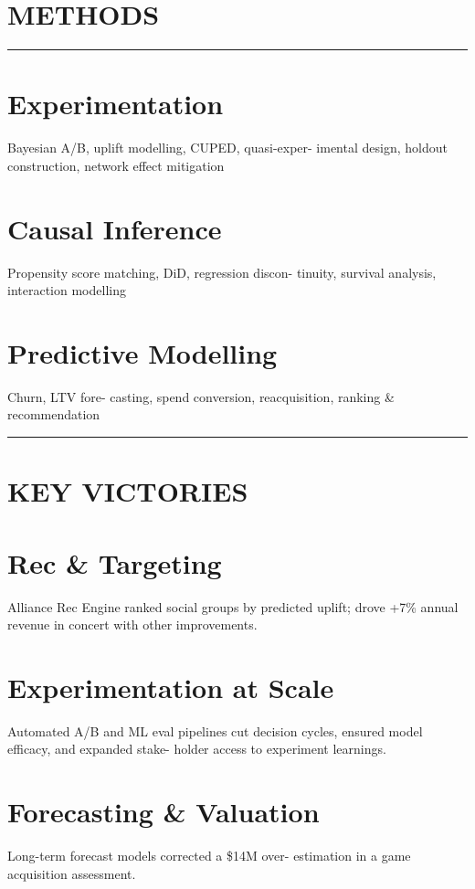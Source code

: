 %

\section{METHODS}
\vspace{-0.1cm}%
\noindent\rule{\textwidth}{0.4pt}
\vspace{-0.1cm}%
%
\section{\large Experimentation}
Bayesian A/B, uplift modelling, CUPED, quasi-exper- imental design, holdout construction, network effect mitigation
~
\section{\large Causal Inference}
Propensity score matching, DiD, regression discon- tinuity, survival analysis, interaction modelling
~
\section{\large Predictive Modelling}
Churn, LTV fore- casting, spend conversion, reacquisition, ranking \& recommendation
%
\noindent\rule{\textwidth}{0.4pt}%
\vspace{-0.1cm}%
%
\section{KEY VICTORIES}
\vspace{-0.25cm}
%
\section{\large \faGem Rec \& Targeting}
Alliance Rec Engine ranked social groups by predicted uplift; drove +7\% annual revenue in concert with other improvements.
%
\section{\large \faGem Experimentation at Scale}
Automated A/B and ML eval pipelines cut decision cycles, ensured model efficacy, and expanded stake- holder access to experiment learnings.
%
\section{\large \faGem Forecasting \& Valuation}
Long-term forecast models corrected a \$14M over- estimation in a game acquisition assessment.
